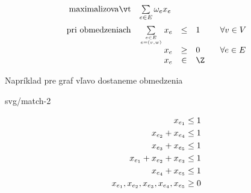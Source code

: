 \begin{equation}
\label{eq:ILPa:1}
\begin{array}{rrcll}
  {\rm maximalizovať}     & \multicolumn{1}{l}{\sum\limits_{e\in E}\omega_ex_e}\\[3ex]
  {\rm pri\ obmedzeniach} & \sum\limits_{e\in E\atop e=(v,w)}x_e&\le&1& \;\;\;\forall v\in V\\
                          & x_e&\ge&0& \;\;\;\forall e\in E\\
                          & x_e&\in&\Z
\end{array}
\end{equation}

\noindent
Napríklad pre graf vľavo dostaneme obmedzenia\\
\begin{minipage}[t]{0.4\textwidth}
  \vskip 0pt
  \begin{myfig}{0.8\textwidth}{svg/match-2}
\end{myfig}
\end{minipage}
\begin{minipage}[t]{0.6\textwidth}
\vskip 0pt
\begin{align}
  x_{e_1}&\le1\notag\\
  x_{e_2}+x_{e_4}&\le1\notag\\
  x_{e_3}+x_{e_5}&\le1\notag\\
  x_{e_1}+x_{e_2}+x_{e_3}&\le1\label{eq:ILPa:2}\\
  x_{e_4}+x_{e_5}&\le1\notag\\
  x_{e_1},x_{e_2},x_{e_3},x_{e_4},x_{e_5}&\ge0\notag
\end{align}
\end{minipage}

